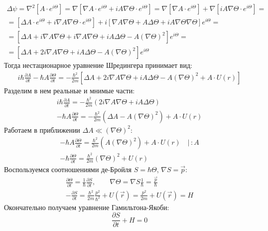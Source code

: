 \begin{gather*}
\Delta\psi=\nabla^2\left[A\cdot e^{i\Theta}\right]=
\nabla\left[\nabla A\cdot e^{i\Theta}+iA\nabla\Theta \cdot e^{i\Theta}\right]=
\nabla\left[
	\nabla A\cdot e^{i\Theta}
	\right]+\nabla\left[
		iA\nabla\Theta \cdot e^{i\Theta}
	\right]=\\=
\left[
	\Delta A \cdot e^{i\Theta}+i\nabla A\nabla\Theta \cdot e^{i\Theta}\right]+
i\left[
	\nabla A\nabla \Theta+A\Delta\Theta+
	iA\nabla \Theta \nabla \Theta
\right]e^{i\Theta}=\\=
\left[
	\Delta A +i\nabla A\nabla\Theta + i\nabla A\nabla \Theta+iA\Delta\Theta - A(\nabla \Theta)^2
\right]e^{i\Theta}=\\=
\left[
	\Delta A +2i\nabla A\nabla\Theta +iA\Delta\Theta - A(\nabla \Theta)^2
\right]e^{i\Theta}
\end{gather*}
Тогда нестационарное уравнение Шредингера принимает вид:
\begin{gather*}
	i\hbar \frac{\partial A}{\partial t}-\hbar A\frac{\partial \Theta}{\partial t}=-\frac{\hbar^2}{2m}\left[
	\Delta A +2i\nabla A\nabla\Theta +iA\Delta\Theta - A(\nabla \Theta)^2+A\cdot U(r)
\right]
\end{gather*}
Разделим в нем реальные и мнимые части:
\begin{gather*}
	i\hbar \frac{\partial A}{\partial t}=-\frac{\hbar^2}{2m}
	(2i\nabla A\nabla\Theta+iA\Delta\Theta)\\
	-\hbar A\frac{\partial \Theta}{\partial t}=-\frac{\hbar^2}{2m}\left(\Delta A - A(\nabla \Theta)^2\right)+A\cdot U(r)
\end{gather*}
Работаем в приближении $\Delta A \ll (\nabla\Theta)^2$:
\begin{gather*}
	-\hbar A\frac{\partial \Theta}{\partial t}=\frac{\hbar^2}{2m}\left(A(\nabla \Theta)^2\right)+A\cdot U(r)\quad \bigg|\,:A\\
	-\hbar \frac{\partial \Theta}{\partial t}=\frac{\hbar^2}{2m}(\nabla \Theta)^2+U(r)
\end{gather*}
Воспользуемся соотношениями де-Бройля $S=\hbar\Theta$, $\nabla S=\vec{p}$:
\begin{gather*}
	\frac{\partial \Theta}{\partial t}=\frac{1}{\hbar}\frac{\partial S}{\partial t}, \qquad
	\nabla\Theta=\nabla S\frac{1}{\hbar}=\frac{\vec{p}}{\hbar}\\
%
	-\frac{\partial S}{\partial t}=\frac{\hbar^2}{2m}\frac{p^2}{\hbar^2}+U(\vec{r})=\frac{p^2}{2m}+U(\vec{r})=H
\end{gather*}
Окончательно получаем уравнение Гамильтона-Якоби:
\begin{equation*}
	\frac{\partial S}{\partial t}+H=0
\end{equation*}
